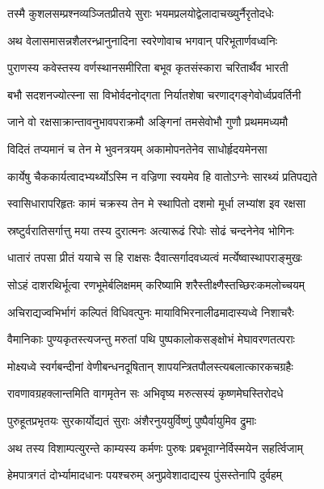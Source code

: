 \twolineshloka
{तस्मै कुशलसम्प्रश्नव्यञ्जितप्रीतये सुराः}
{भयमप्रलयोद्वेलादाचख्युर्नैरृतोदधेः} %

\twolineshloka
{अथ वेलासमासन्नशैलरन्ध्रानुनादिना}
{स्वरेणोवाच भगवान् परिभूतार्णवध्वनिः} %

\twolineshloka
{पुराणस्य कवेस्तस्य वर्णस्थानसमीरिता}
{बभूव कृतसंस्कारा चरितार्थैव भारती} %

\twolineshloka
{बभौ सदशनज्योत्स्ना सा विभोर्वदनोद्गता}
{निर्यातशेषा चरणाद्गङ्गेवोर्ध्वप्रवर्तिनी} %

\twolineshloka
{जाने वो रक्षसाक्रान्तावनुभावपराक्रमौ}
{अङ्गिनां तमसेवोभौ गुणौ प्रथममध्यमौ} %

\twolineshloka
{विदितं तप्यमानं च तेन मे भुवनत्रयम्}
{अकामोपनतेनेव साधोर्हृदयमेनसा} %

\twolineshloka
{कार्येषु चैककार्यत्वादभ्यर्थ्योऽस्मि न वज्रिणा}
{स्वयमेव हि वातोऽग्नेः सारथ्यं प्रतिपद्यते} %

\twolineshloka
{स्वासिधारापरिहृतः कामं चक्रस्य तेन मे}
{स्थापितो दशमो मूर्धा लभ्यांश इव रक्षसा} %

\twolineshloka
{स्रष्टुर्वरातिसर्गात्तु मया तस्य दुरात्मनः}
{अत्यारूढं रिपोः सोढं चन्दनेनेव भोगिनः} %

\twolineshloka
{धातारं तपसा प्रीतं ययाचे स हि राक्षसः}
{दैवात्सर्गादवध्यत्वं मर्त्येष्वास्थापराङ्मुखः} %

\twolineshloka
{सोऽहं दाशरथिर्भूत्वा रणभूमेर्बलिक्षमम्}
{करिष्यामि शरैस्तीक्ष्णैस्तच्छिरःकमलोच्चयम्} %

\twolineshloka
{अचिराद्यज्वभिर्भागं कल्पितं विधिवत्पुनः}
{मायाविभिरनालीढमादास्यध्वे निशाचरैः} %

\twolineshloka
{वैमानिकाः पुण्यकृतस्त्यजन्तु मरुतां पथि}
{पुष्पकालोकसङ्क्षोभं मेघावरणतत्पराः} %

\twolineshloka
{मोक्ष्यध्वे स्वर्गबन्दीनां वेणीबन्धनदूषितान्}
{शापयन्त्रितपौलस्त्यबलात्कारकचग्रहैः} %

\twolineshloka
{रावणावग्रहक्लान्तमिति वागमृतेन सः}
{अभिवृष्य मरुत्सस्यं कृष्णमेघस्तिरोदधे} %

\twolineshloka
{पुरुहूतप्रभृतयः सुरकार्योद्यतं सुराः}
{अंशैरनुययुर्विष्णुं पुष्पैर्वायुमिव द्रुमाः} %

\twolineshloka
{अथ तस्य विशाम्पत्युरन्ते काम्यस्य कर्मणः}
{पुरुषः प्रबभूवाग्नेर्विस्मयेन सहर्त्विजाम्} %

\twolineshloka
{हेमपात्रगतं दोर्भ्यामादधानः पयश्चरुम्}
{अनुप्रवेशादाद्यस्य पुंसस्तेनापि दुर्वहम्} %

